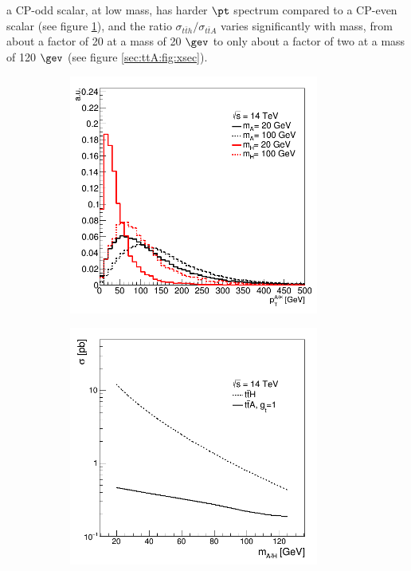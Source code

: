 \bi
\ib a CP-odd scalar, at low mass, has harder $\pt$ spectrum compared to a CP-even scalar (see figure \ref{sec:ttA:fig:hpt}), and
\ib  the ratio $\sigma_{t\bar{t}h}/\sigma_{t\bar{t}A}$ varies significantly with mass, from about a factor of 20 at a mass of 20 $\gev$ to only about a factor of two at a mass of 120 $\gev$ (see figure \ref{sec:ttA:fig:xsec}).
\ei

\begin{figure}[htbp!]
\centering
\begin{subfigure}{0.45\textwidth}
  \centering
  \includegraphics[width=0.9\textwidth]{figures/ttA/hpt.png}
  \caption{}
  \label{sec:ttA:fig:hpt}
\end{subfigure}
\begin{subfigure}{0.45\textwidth}
  \centering
  \includegraphics[width=0.9\textwidth]{figures/ttA/XSec.png}

\end{subfigure}
\end{figure}
